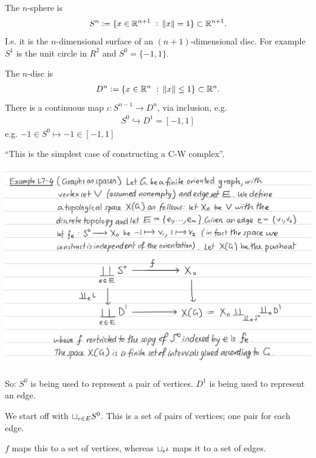 \begin{example}
  \begin{definition}
    The $n$-sphere is
    \begin{align*}
      S^n := \{x \in \mathbb{R}^{n+1} ~:~ \norm{x} = 1\} \subset \mathbb{R}^{n+1}.
    \end{align*}
    I.e. it is the $n$-dimensional surface of an $(n+1)$-dimensional disc. For example $S^1$ is the
    unit circle in $R^2$ and $S^0 = \{-1, 1\}$.

    The $n$-disc is
    \begin{align*}
      D^n := \{x \in \mathbb{R}^{n} ~:~ \norm{x} \leq 1\} \subset \mathbb{R}^{n}.
    \end{align*}
    There is a continuous map $\iota: S^{n-1} \to D^n$, via inclusion, e.g.
    \begin{align*}
      S^0 \hookrightarrow D^1 = [-1, 1]
    \end{align*}
    e.g. $-1 \in S^0 \mapsto -1 \in [-1, 1]$
  \end{definition}


  ``This is the simplest case of constructing a C-W complex​''.

\begin{mdframed}
\includegraphics[width=400pt]{img/analysis--berkeley-202a-topology-0021.png}
\end{mdframed}
So: $S^0$ is being used to represent a pair of vertices. $D^1$ is being used to represent an edge.

We start off with $\sqcup_{e \in E} S^0$. This is a set of pairs of vertices; one pair for each
edge.

$f$ maps this to a set of vertices, whereas $\sqcup_e \iota$ maps it to a set of edges.


\end{example}
